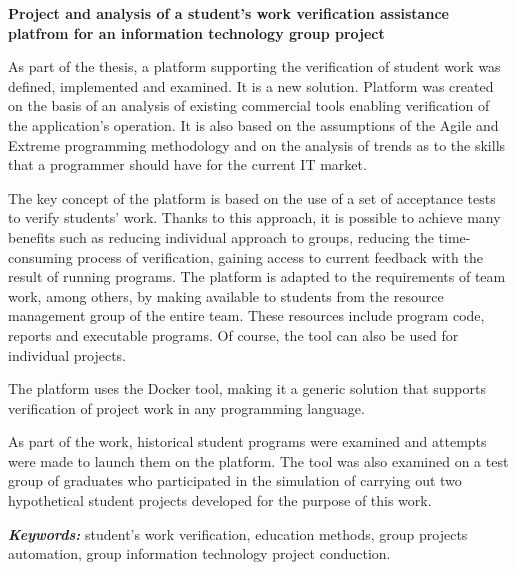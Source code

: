 \vfill
\pagebreak

\begin{center}
    \textbf{Project and analysis of a student's work verification assistance platfrom for an information technology group project}
\end{center}
 \newline

As part of the thesis, a platform supporting the verification of student work was defined, implemented and examined.
It is a new solution.
Platform was created on the basis of an analysis of existing commercial tools enabling verification of the application's operation.
It is also based on the assumptions of the Agile and Extreme programming methodology and on the analysis of trends as to the skills that a programmer should have for the current IT market.

The key concept of the platform is based on the use of a set of acceptance tests to verify students' work.
Thanks to this approach, it is possible to achieve many benefits such as reducing individual approach to groups, reducing the time-consuming process of verification, gaining access to current feedback with the result of running programs.
The platform is adapted to the requirements of team work, among others, by making available to students from the resource management group of the entire team.
These resources include program code, reports and executable programs.
Of course, the tool can also be used for individual projects.

The platform uses the Docker tool, making it a generic solution that supports verification of project work in any programming language.

As part of the work, historical student programs were examined and attempts were made to launch them on the platform.
The tool was also examined on a test group of graduates who participated in the simulation of carrying out two hypothetical student projects developed for the purpose of this work.\newline

\textit{\textbf{Keywords:}} student's work verification, education methods, group projects automation, group information technology project conduction.

\cleardoublepage
